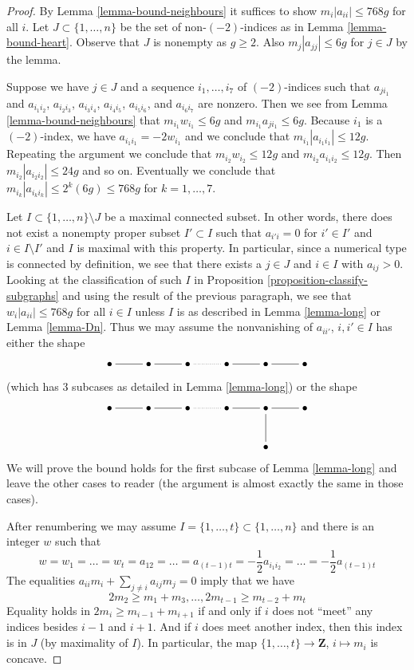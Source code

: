 \documentclass[10pt,a4paper]{amsart}
\theoremstyle{plain}
\theoremstyle{definition}
\theoremstyle{remark}
\numberwithin{equation}{subsection}
\begin{document}
\begin{proof}
By Lemma \ref{lemma-bound-neighbours} it suffices to show
$m_i|a_{ii}| \leq 768g$ for all $i$.
Let $J \subset \{1, \ldots, n\}$ be the set of non-$(-2)$-indices
as in Lemma \ref{lemma-bound-heart}. Observe that $J$ is
nonempty as $g \geq 2$. Also $m_j|a_{jj}| \leq 6g$ for $j \in J$
by the lemma.

\medskip\noindent
Suppose we have $j \in J$ and a sequence $i_1, \ldots, i_7$
of $(-2)$-indices such that $a_{ji_1}$ and $a_{i_1i_2}$,
$a_{i_2i_3}$, $a_{i_3i_4}$, $a_{i_4i_5}$, $a_{i_5i_6}$, and
$a_{i_6i_7}$ are nonzero. Then we see from
Lemma \ref{lemma-bound-neighbours}
that $m_{i_1}w_{i_1} \leq 6g$ and $m_{i_1}a_{ji_1} \leq 6g$.
Because $i_1$ is a $(-2)$-index, we have $a_{i_1i_1} = -2w_{i_1}$
and we conclude that $m_{i_1}|a_{i_1i_1}| \leq 12g$.
Repeating the argument we conclude that
$m_{i_2}w_{i_2} \leq 12g$ and $m_{i_2}a_{i_1i_2} \leq 12g$.
Then $m_{i_2}|a_{i_2i_2}| \leq 24g$ and so on.
Eventually we conclude that
$m_{i_k}|a_{i_ki_k}| \leq 2^k(6g) \leq 768g$ for $k = 1, \ldots, 7$.

\medskip\noindent
Let $I \subset \{1, \ldots, n\} \setminus J$ be a maximal connected subset.
In other words, there does not exist a nonempty proper subset
$I' \subset I$ such that
$a_{i'i} = 0$ for $i' \in I'$ and $i \in I \setminus I'$
and $I$ is maximal with this property. In particular, since
a numerical type is connected by definition, we see that there
exists a $j \in J$ and $i \in I$ with $a_{ij} > 0$.
Looking at the classification
of such $I$ in Proposition \ref{proposition-classify-subgraphs}
and using the result of the previous paragraph, we see that
$w_i|a_{ii}| \leq 768g$ for all $i \in I$ unless $I$ is as described in
Lemma \ref{lemma-long} or
Lemma \ref{lemma-Dn}.
Thus we may assume the nonvanishing of $a_{ii'}$, $i, i' \in I$
has either the shape
$$
\xymatrix{
\bullet \ar@{-}[r] &
\bullet \ar@{-}[r] &
\bullet \ar@{..}[r] &
\bullet \ar@{-}[r] &
\bullet \ar@{-}[r] &
\bullet
}
$$
(which has 3 subcases as detailed in Lemma \ref{lemma-long})
or the shape
$$
\xymatrix{
\bullet \ar@{-}[r] &
\bullet \ar@{-}[r] &
\bullet \ar@{..}[r] &
\bullet \ar@{-}[r] &
\bullet \ar@{-}[r] \ar@{-}[d] &
\bullet \\
& & & & \bullet
}
$$
We will prove the bound holds for the first subcase of
Lemma \ref{lemma-long} and leave the other cases to reader (the argument
is almost exactly the same in those cases).

\medskip\noindent
After renumbering we may assume $I = \{1, \ldots, t\} \subset \{1, \ldots, n\}$
and there is an integer $w$ such that
$$
w = w_1 = \ldots = w_t =
a_{12} = \ldots = a_{(t - 1) t} =
-\frac{1}{2} a_{i_1i_2} = \ldots = -\frac{1}{2} a_{(t - 1) t}
$$
The equalities $a_{ii}m_i + \sum_{j \not = i} a_{ij}m_j = 0$ imply
that we have
$$
2m_2 \geq m_1 + m_3, \ldots, 2m_{t - 1} \geq m_{t - 2} + m_t
$$
Equality holds in $2m_i \geq m_{i - 1} + m_{i + 1}$
if and only if $i$ does not ``meet'' any indices besides
$i - 1$ and $i + 1$. And if $i$ does meet
another index, then this index is in $J$ (by maximality of $I$).
In particular, the map
$\{1, \ldots, t\} \to \mathbf{Z}$, $i \mapsto m_i$ is concave.


\end{proof}
\end{document}
